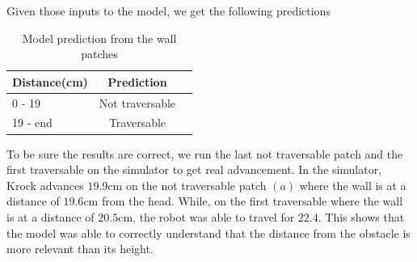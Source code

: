\documentclass[../document.tex]{subfiles}
\begin{document}
Given those inputs to the model, we get the following predictions

\begin{table}[H]
    \centering
    \begin{tabular}{l|cc}
        Distance(cm) & Prediction \\ 
        \hline
        0 - 19  & Not traversable \\ 
        19 - end & Traversable \\ 
        \hline
    \end{tabular}
    \caption{Model prediction from the wall patches}
\end{table}
To be sure the results are correct, we run the last not traversable patch and the first traversable
on the simulator to get real advancement. In the simulator, Krock advances $19.9$cm on the not traversable patch $(a)$ where the wall is at a distance of $19.6$cm from the head. While, on the first traversable where the wall is at a distance of $20.5$cm, the robot was able to travel for $22.4$. This shows that the model was able to correctly understand that the distance from the obstacle is more relevant than its height.
\end{document}
